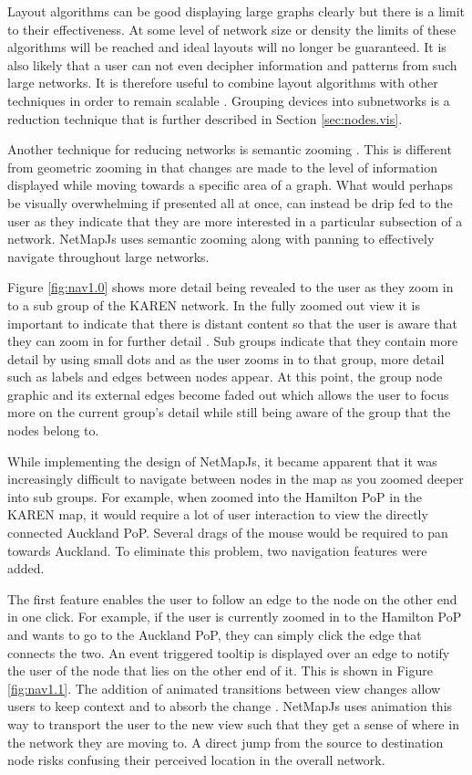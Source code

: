 \documentclass[11pt, a4paper]{article}
\begin{document}
Layout algorithms can be good displaying large graphs clearly but there is a
limit to their effectiveness. At some level of network size or density the
limits of these algorithms will be reached and ideal layouts will no longer be
guaranteed. It is also likely that a user can not even decipher information and
patterns from such large networks. It is therefore useful to combine layout
algorithms with other techniques in order to remain scalable \cite{Herman_2000}.
Grouping devices into subnetworks is a reduction technique that is further
described in Section \ref{sec:nodes.vis}. 

Another technique for reducing networks is semantic zooming \cite{Perlin_1993}.
This is different from geometric zooming in that changes are made to the level
of information displayed while moving towards a specific area of a graph. What
would perhaps be visually overwhelming if presented all at once, can instead be
drip fed to the user as they indicate that they are more interested in a
particular subsection of a network. NetMapJs uses semantic zooming along
with panning to effectively navigate throughout large networks. 

Figure \ref{fig:nav1.0} shows more detail being revealed to the user as they
zoom in to a sub group of the KAREN network. In the fully zoomed out view it is
important to indicate that there is distant content so that the user is aware
that they can zoom in for further detail \cite{Spence_2007}. Sub groups indicate
that they contain more detail by using small dots and as the user zooms in to
that group, more detail such as labels and edges between nodes appear. At this
point, the group node graphic and its external edges become faded out which
allows the user to focus more on the current group's detail while still being
aware of the group that the nodes belong to.

While implementing the design of NetMapJs, it became apparent that it was
increasingly difficult to navigate between nodes in the map as you zoomed deeper
into sub groups. For example, when zoomed into the Hamilton PoP in the KAREN
map, it would require a lot of user interaction to view the directly connected
Auckland PoP. Several drags of the mouse would be required to pan towards
Auckland. To eliminate this problem, two navigation features were added.

The first feature enables the user to follow an edge to the node on the other
end in one click. For example, if the user is currently zoomed in to the
Hamilton PoP and wants to go to the Auckland PoP, they can simply click the edge
that connects the two. An event triggered tooltip is displayed over an edge to
notify the user of the node that lies on the other end of it. This is shown in
Figure \ref{fig:nav1.1}. The addition of animated transitions between view
changes allow users to keep context and to absorb the change
\cite{Lamping_1995}.  NetMapJs uses animation this way to transport the user to
the new view such that they get a sense of where in the network they are moving
to. A direct jump from the source to destination node risks confusing their
perceived location in the overall network.
\end{document}

